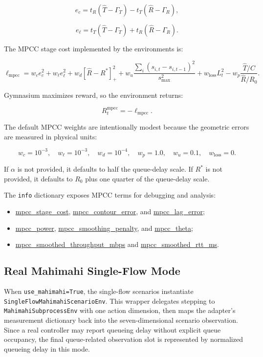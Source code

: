 \documentclass[11pt]{article}
\begin{document}
\[
e_c = t_R(\hat{T}-\Gamma_T) - t_T(\hat{R}-\Gamma_R),
\]

\[
e_\ell = t_T(\hat{T}-\Gamma_T) + t_R(\hat{R}-\Gamma_R).
\]

The MPCC stage cost implemented by the environments is:

\[
\ell_{\mathrm{mpcc}} =
w_c e_c^2
+ w_\ell e_\ell^2
+ w_d [\hat{R}-R^*]_+^2
+ w_u \frac{\sum_i (s_{i,t}-s_{i,t-1})^2}{s_{\max}^2}
+ w_{\mathrm{loss}} L_t^2
- w_p
\frac{\hat{T}/C}{\hat{R}/R_0}.
\]

Gymnasium maximizes reward, so the environment returns:

\[
R_t^{\mathrm{mpcc}} = -\ell_{\mathrm{mpcc}}.
\]

The default MPCC weights are intentionally modest because the geometric errors
are measured in physical units:

\[
w_c=10^{-3},\quad
w_\ell=10^{-3},\quad
w_d=10^{-4},\quad
w_p=1.0,\quad
w_u=0.1,\quad
w_{\mathrm{loss}}=0.
\]

If \(\alpha\) is not provided, it defaults to half the queue-delay scale. If
\(R^*\) is not provided, it defaults to \(R_0\) plus one quarter of the
queue-delay scale.

The \texttt{info} dictionary exposes MPCC terms for debugging and analysis:

\begin{itemize}
  \item \url{mpcc_stage_cost}, \url{mpcc_contour_error}, and
        \url{mpcc_lag_error};
  \item \url{mpcc_power}, \url{mpcc_smoothing_penalty}, and
        \url{mpcc_theta};
  \item \url{mpcc_smoothed_throughput_mbps} and
        \url{mpcc_smoothed_rtt_ms}.
\end{itemize}

\subsection{Real Mahimahi Single-Flow Mode}

When \texttt{use\_mahimahi=True}, the single-flow scenarios instantiate
\texttt{SingleFlowMahimahiScenarioEnv}. This wrapper delegates stepping to
\texttt{MahimahiSubprocessEnv} with one action dimension, then maps the
adapter's measurement dictionary back into the seven-dimensional scenario
observation. Since a real controller may report queueing delay without explicit
queue occupancy, the final queue-related observation slot is represented by
normalized queueing delay in this mode.
\end{document}
